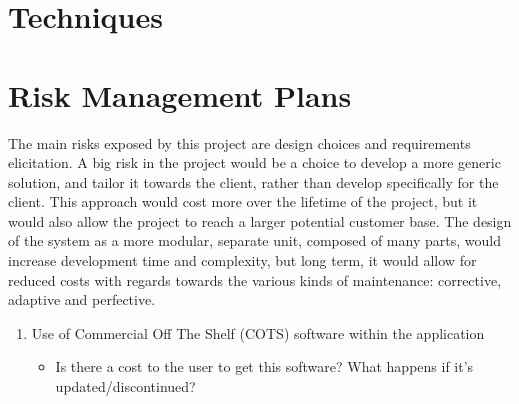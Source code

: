 \section{Techniques}

\section{Risk Management Plans}

The main risks exposed by this project are design choices and requirements elicitation. A big risk in the project would be a choice to develop a more generic solution, and tailor it towards the client, rather than develop specifically for the client. This approach would cost more over the lifetime of the project, but it would also allow the project to reach a larger potential customer base. The design of the system as a more modular, separate unit, composed of many parts, would increase development time and complexity, but long term, it would allow for reduced costs with regards towards the various kinds of maintenance: corrective, adaptive and perfective. 

\begin{enumerate}
\item Use of Commercial Off The Shelf (COTS) software within the application
\begin{itemize}
\item Is there a cost to the user to get this software? What happens if it's updated/discontinued?
\end{itemize}
\end{enumerate}